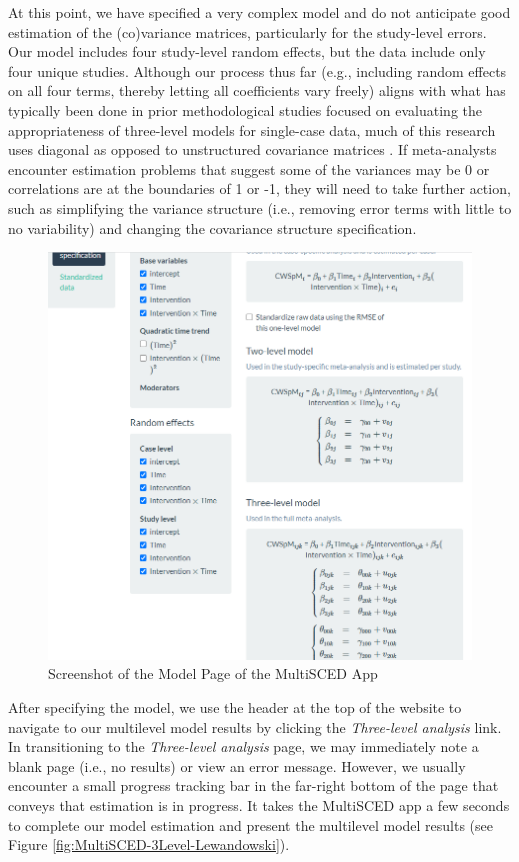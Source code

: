 \documentclass[
]{book}
\begin{document}
At this point, we have specified a very complex model and do not anticipate good estimation of the (co)variance matrices, particularly for the study-level errors. Our model includes four study-level random effects, but the data include only four unique studies. Although our process thus far (e.g., including random effects on all four terms, thereby letting all coefficients vary freely) aligns with what has typically been done in prior methodological studies focused on evaluating the appropriateness of three-level models for single-case data, much of this research uses diagonal as opposed to unstructured covariance matrices \citep[e.g.,][]{Joo_et_al_2019, Moeyaert_Ugille_Ferron_Beretvas_VandenNoortgate_2013, Moeyaert_Ugille_Ferron_Beretvas_VanDenNoortgate_2016}. If meta-analysts encounter estimation problems that suggest some of the variances may be 0 or correlations are at the boundaries of 1 or -1, they will need to take further action, such as simplifying the variance structure (i.e., removing error terms with little to no variability) and changing the covariance structure specification.

\begin{figure}
\includegraphics[width=0.6\linewidth]{images/MultiSCED_model.modelspec_Lewandowski2011} \caption{Screenshot of the Model Page of the MultiSCED App}\label{fig:MultiSCED-modelspec-Lewandowski}
\end{figure}

After specifying the model, we use the header at the top of the website to navigate to our multilevel model results by clicking the \emph{Three-level analysis} link. In transitioning to the \emph{Three-level analysis} page, we may immediately note a blank page (i.e., no results) or view an error message. However, we usually encounter a small progress tracking bar in the far-right bottom of the page that conveys that estimation is in progress. It takes the MultiSCED app a few seconds to complete our model estimation and present the multilevel model results (see Figure \ref{fig:MultiSCED-3Level-Lewandowski}).
\end{document}

